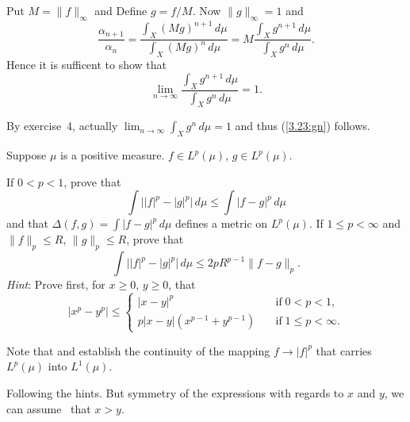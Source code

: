\begin{enumerate}
Put \(M = \|f\|_\infty\) and Define \(g = f/M\).
Now \(\|g\|_\infty = 1\) and
\begin{equation*}
 \frac{\alpha_{n+1}}{\alpha_{n}}
 =
 \frac{\int_X (Mg)^{n+1}\,d\mu}{\int_X (Mg)^{n}\,d\mu}
 =
 M \frac{\int_X g^{n+1}\,d\mu}{\int_X g^{n}\,d\mu}.
\end{equation*}
Hence it is sufficent to show that
\begin{equation} \label{3.23:gn}
 \lim_{n\to\infty} \frac{\int_X g^{n+1}\,d\mu}{\int_X g^{n}\,d\mu} = 1.
\end{equation}

By exercise~4,
actually \(\lim_{n\to\infty} \int_X g^n\,d\mu = 1\)
and thus (\ref{3.23:gn}) follows.

\begin{excopy}
Suppose \(\mu\) is a positive measure.
\(f\in L^p(\mu)\), \(g\in L^p(\mu)\).
\begin{itemize}
  If \(0<p<1\), prove that
  \begin{equation*} %
   \int \bigl| |f|^p - |g|^p \bigr|\,d\mu \leq \int |f - g|^p \,d\mu
  \end{equation*}
  and that \(\Delta(f,g) = \int|f-g|^p\,d\mu\)
  defines a metric on \(L^p(\mu)\).
  If \(1 \leq p < \infty\) and \(\|f\|_p\leq R\), \(\|g\|_p\leq R\),
  prove that
  \begin{equation*}
   \int \bigl| |f|^p - |g|^p \bigr|\,d\mu \leq 2pR^{p-1}\|f-g\|_p.
  \end{equation*}
  \emph{Hint}: Prove first, for \(x\geq 0\), \(y\geq 0\), that
  \begin{equation*}
   |x^p - y^p| \leq
   \left\{\begin{array}{ll}
          |x-y|^p                   & \quad \textrm{if}\; 0<p<1, \\
          p|x-y|(x^{p-1} + y^{p-1}) & \quad \textrm{if}\; 1\leq p < \infty.
          \end{array}\right.
  \end{equation*}
\end{itemize}
Note that  and  establish the continuity of the mapping
\(f\to |f|^p\) that carries \(L^p(\mu)\) into \(L^1(\mu)\).
\end{excopy}

Following the hints.
But symmetry of the expressions with regards to $x$ and $y$,
we can assume \wlogy\ that \(x>y\).


\end{enumerate}
